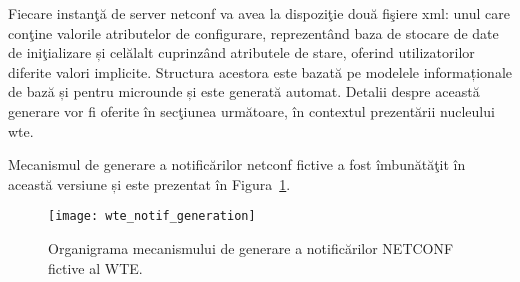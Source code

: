 Fiecare instanţă de server \gls{netconf} va avea la dispoziţie două fişiere \gls{xml}: unul care conţine valorile atributelor de configurare, reprezentând baza de stocare de date de iniţializare și celălalt cuprinzând atributele de stare, oferind utilizatorilor diferite valori implicite. Structura acestora este bazată pe modelele informaționale de bază și pentru microunde și este generată automat. Detalii despre această generare vor fi oferite în secţiunea următoare, în contextul prezentării nucleului \gls{wte}.

Mecanismul de generare a notificărilor \gls{netconf} fictive a fost îmbunătăţit în această versiune și este prezentat în Figura~\ref{fig:wte_notif_generation}. 

\begin{figure}[h]
	\centering
	\texttt{[image: wte\_notif\_generation]}
	\caption{Organigrama mecanismului de generare a notificărilor NETCONF fictive al WTE.}
	\label{fig:wte_notif_generation}
\end{figure}

